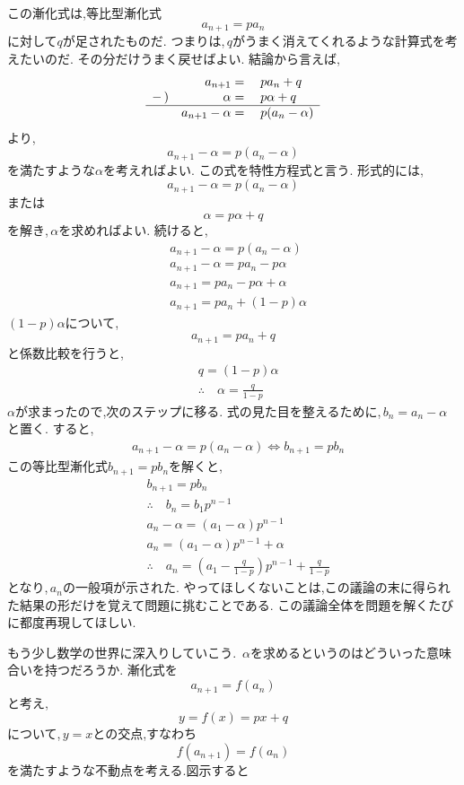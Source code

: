     この漸化式は,等比型漸化式
    \[
      a_{n+1}=pa_n
    \]
    に対して$q$が足されたものだ.
    つまりは,\,$q$がうまく消えてくれるような計算式を考えたいのだ.
    その分だけうまく戻せばよい.
    結論から言えば,
    \[
      \begin{array}{rrl}
         & a_{n+1}={} & pa_n+q\\
        -\,) & \alpha={} & p\alpha+q\\ \hline
         & a_{n+1}-\alpha={} & p(a_n-\alpha)
      \end{array}
    \]
    より,
    \[
      a_{n+1}-\alpha=p(a_n-\alpha)
    \]
    を満たすような$\alpha$を考えればよい.
    この式を特性方程式と言う.
    形式的には,
    \[
      a_{n+1}-\alpha=p(a_n-\alpha)
    \]
    または
    \[
      \alpha=p\alpha+q
    \]
    を解き,\,$\alpha$を求めればよい.
    続けると,
    \begin{align*}
      &a_{n+1}-\alpha=p(a_n-\alpha)\\
      &a_{n+1}-\alpha=pa_n-p\alpha\\
      &a_{n+1}=pa_n-p\alpha+\alpha\\
      &a_{n+1}=pa_n+(1-p)\alpha
    \end{align*}
    $(1-p)\alpha$について,
    \[
      a_{n+1}=pa_n+q
    \]
    と係数比較を行うと,
    \begin{align*}
      &q=(1-p)\alpha\\
      &\therefore \quad \alpha=\frac{q}{1-p}
    \end{align*}
    $\alpha$が求まったので,次のステップに移る.
    式の見た目を整えるために,\,$b_n=a_n-\alpha$と置く.
    すると,
    \begin{align*}
      &a_{n+1}-\alpha=p(a_n-\alpha) \iff b_{n+1}=pb_n
    \end{align*}
    この等比型漸化式$b_{n+1}=pb_n$を解くと,
    \begin{align*}
      &b_{n+1}=pb_n\\
      &\therefore \quad b_n=b_1p^{n-1}\\
      &a_n-\alpha=(a_1-\alpha)p^{n-1}\\
      &a_n=(a_1-\alpha)p^{n-1}+\alpha\\
      &\therefore \quad a_n=\left(a_1-\frac{q}{1-p}\right)p^{n-1}+\frac{q}{1-p}
    \end{align*}
    となり,\,$a_n$の一般項が示された.
    やってほしくないことは,この議論の末に得られた結果の形だけを覚えて問題に挑むことである.
    この議論全体を問題を解くたびに都度再現してほしい.

    もう少し数学の世界に深入りしていこう.
    \,$\alpha$を求めるというのはどういった意味合いを持つだろうか.
    漸化式を
    \[
      a_{n+1}=f(a_n)
    \]
    と考え,
    \[
      y=f(x)=px+q
    \]
    について,\,$y=x$との交点,すなわち
    \[
      f(a_{n+1})=f(a_n)
    \]
    を満たすような不動点を考える.図示すると

